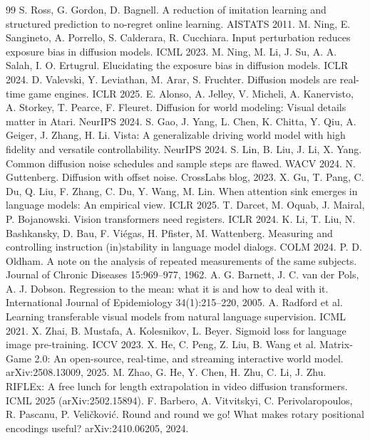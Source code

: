 \begin{thebibliography}{99}
 S. Ross, G. Gordon, D. Bagnell. A reduction of imitation learning and structured prediction to no-regret online learning. AISTATS 2011.
 M. Ning, E. Sangineto, A. Porrello, S. Calderara, R. Cucchiara. Input perturbation reduces exposure bias in diffusion models. ICML 2023.
 M. Ning, M. Li, J. Su, A. A. Salah, I. O. Ertugrul. Elucidating the exposure bias in diffusion models. ICLR 2024.
 D. Valevski, Y. Leviathan, M. Arar, S. Fruchter. Diffusion models are real-time game engines. ICLR 2025.
 E. Alonso, A. Jelley, V. Micheli, A. Kanervisto, A. Storkey, T. Pearce, F. Fleuret. Diffusion for world modeling: Visual details matter in Atari. NeurIPS 2024.
 S. Gao, J. Yang, L. Chen, K. Chitta, Y. Qiu, A. Geiger, J. Zhang, H. Li. Vista: A generalizable driving world model with high fidelity and versatile controllability. NeurIPS 2024.
 S. Lin, B. Liu, J. Li, X. Yang. Common diffusion noise schedules and sample steps are flawed. WACV 2024.
 N. Guttenberg. Diffusion with offset noise. CrossLabs blog, 2023.
 X. Gu, T. Pang, C. Du, Q. Liu, F. Zhang, C. Du, Y. Wang, M. Lin. When attention sink emerges in language models: An empirical view. ICLR 2025.
 T. Darcet, M. Oquab, J. Mairal, P. Bojanowski. Vision transformers need registers. ICLR 2024.
 K. Li, T. Liu, N. Bashkansky, D. Bau, F. Vi\'egas, H. Pfister, M. Wattenberg. Measuring and controlling instruction (in)stability in language model dialogs. COLM 2024.
 P. D. Oldham. A note on the analysis of repeated measurements of the same subjects. Journal of Chronic Diseases 15:969--977, 1962.
 A. G. Barnett, J. C. van der Pols, A. J. Dobson. Regression to the mean: what it is and how to deal with it. International Journal of Epidemiology 34(1):215--220, 2005.
 A. Radford et al. Learning transferable visual models from natural language supervision. ICML 2021.
 X. Zhai, B. Mustafa, A. Kolesnikov, L. Beyer. Sigmoid loss for language image pre-training. ICCV 2023.
 X. He, C. Peng, Z. Liu, B. Wang et al. Matrix-Game 2.0: An open-source, real-time, and streaming interactive world model. arXiv:2508.13009, 2025.
 M. Zhao, G. He, Y. Chen, H. Zhu, C. Li, J. Zhu. RIFLEx: A free lunch for length extrapolation in video diffusion transformers. ICML 2025 (arXiv:2502.15894).
 F. Barbero, A. Vitvitskyi, C. Perivolaropoulos, R. Pascanu, P. Veli\v{c}kovi\'c. Round and round we go! What makes rotary positional encodings useful? arXiv:2410.06205, 2024.
\end{thebibliography}
